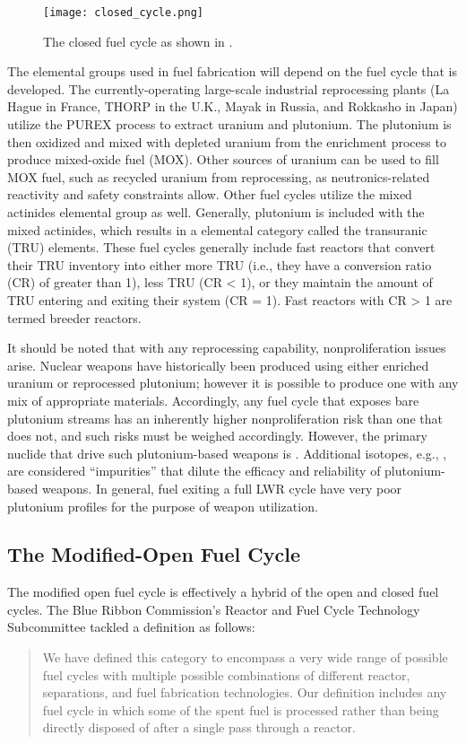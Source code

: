 \begin{figure}[]
  \begin{center}
    \texttt{[image: closed\_cycle.png]}
  \caption{The closed fuel cycle as shown in \cite{cochran1990nuclear}.}
  \label{fig:closed-cycle}
  \end{center}
\end{figure}


The elemental groups used in fuel fabrication will depend on the fuel cycle that
is developed. The currently-operating large-scale industrial reprocessing plants
(La Hague in France, THORP in the U.K., Mayak in Russia, and Rokkasho in Japan)
utilize the PUREX process to extract uranium and plutonium. The plutonium is
then oxidized and mixed with depleted uranium from the enrichment process to
produce mixed-oxide fuel (MOX). Other sources of uranium can be used to fill MOX
fuel, such as recycled uranium from reprocessing, as neutronics-related
reactivity and safety constraints allow. Other fuel cycles utilize the mixed
actinides elemental group as well. Generally, plutonium is included with the
mixed actinides, which results in a elemental category called the transuranic
(TRU) elements. These fuel cycles generally include fast reactors that convert
their TRU inventory into either more TRU (i.e., they have a conversion ratio
(CR) of greater than 1), less TRU (CR < 1), or they maintain the amount of TRU
entering and exiting their system (CR = 1). Fast reactors with CR > 1 are termed
breeder reactors.

It should be noted that with any reprocessing capability, nonproliferation
issues arise. Nuclear weapons have historically been produced using either
enriched uranium or reprocessed plutonium; however it is possible to produce one
with any mix of appropriate materials. Accordingly, any fuel cycle that exposes
bare plutonium streams has an inherently higher nonproliferation risk than one
that does not, and such risks must be weighed accordingly. However, the primary
nuclide that drive such plutonium-based weapons is . Additional
isotopes, e.g., , are considered ``impurities'' that dilute the
efficacy and reliability of plutonium-based weapons. In general, fuel exiting a
full LWR cycle have very poor plutonium profiles for the purpose of weapon
utilization.

\subsection{The Modified-Open Fuel Cycle}

The modified open fuel cycle is effectively a hybrid of the open and closed fuel
cycles. The Blue Ribbon Commission's Reactor and Fuel Cycle
Technology Subcommittee tackled a definition as follows:

\begin{quotation}
We have defined this category to encompass a very wide range of possible fuel
cycles with multiple possible combinations of different reactor, separations,
and fuel fabrication technologies. Our definition includes any fuel cycle in
which some of the spent fuel is processed rather than being directly disposed of
after a single pass through a reactor.~\cite{brc_reactor_2012}
\end{quotation}
